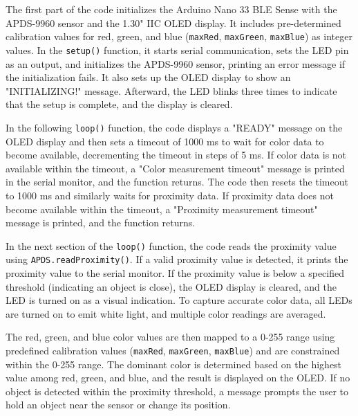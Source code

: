 \smallskip

The first part of the code initializes the Arduino Nano 33 BLE Sense with the APDS-9960 sensor and the 1.30" IIC OLED display. It includes pre-determined calibration values for red, green, and blue (\texttt{maxRed}, \texttt{maxGreen}, \texttt{maxBlue}) as integer values. In the \texttt{setup()} function, it starts serial communication, sets the LED pin as an output, and initializes the APDS-9960 sensor, printing an error message if the initialization fails. It also sets up the OLED display to show an "INITIALIZING!" message. Afterward, the LED blinks three times to indicate that the setup is complete, and the display is cleared.



In the following \texttt{loop()} function, the code displays a "READY" message on the OLED display and then sets a timeout of 1000 ms to wait for color data to become available, decrementing the timeout in steps of 5 ms. If color data is not available within the timeout, a "Color measurement timeout" message is printed in the serial monitor, and the function returns. The code then resets the timeout to 1000 ms and similarly waits for proximity data. If proximity data does not become available within the timeout, a "Proximity measurement timeout" message is printed, and the function returns.



In the next section of the \texttt{loop()} function, the code reads the proximity value using \texttt{APDS.readProximity()}. If a valid proximity value is detected, it prints the proximity value to the serial monitor. If the proximity value is below a specified threshold (indicating an object is close), the OLED display is cleared, and the LED is turned on as a visual indication. To capture accurate color data, all LEDs are turned on to emit white light, and multiple color readings are averaged.

The red, green, and blue color values are then mapped to a 0-255 range using predefined calibration values (\texttt{maxRed}, \texttt{maxGreen}, \texttt{maxBlue}) and are constrained within the 0-255 range. The dominant color is determined based on the highest value among red, green, and blue, and the result is displayed on the OLED. If no object is detected within the proximity threshold, a message prompts the user to hold an object near the sensor or change its position.

